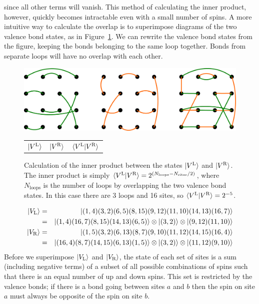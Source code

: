 since all other terms will vanish.  
This method of calculating the inner product, however, quickly becomes intractable even with a small number of spins.
A more intuitive way to calculate the overlap is to superimpose diagrams of the two valence bond states, as in Figure~\ref{overlap}.
We can rewrite the valence bond states from the figure, keeping the bonds belonging to the same 
loop together.  Bonds from separate loops will have no overlap with each other.
\begin{figure} {  
\centering
\includegraphics [width=5.5in]{./figures/made/overlap.pdf} 
\begin{tabular*}{5.5in}{ccc}
\hspace{12mm}$\lvert {V^\text{L}} \rangle$& 
\hspace{39mm}$\lvert {V^\text{R}} \rangle$ \hspace{40mm}& 
\hspace{33mm}$\langle {V^\text{L}} \rvert V^\text{R} \rangle$ \hspace{5mm}\\
\end{tabular*}
 \caption[Illustration of valence bond state inner product calculation]{
 Calculation of the inner product between the states $\lvert {V^\text{L}} \rangle$ and $\lvert {V^\text{R}} \rangle$.
 The inner product is simply 
 $\langle {V^\text{L}} \rvert V^\text{R} \rangle = 2^{(N_{\text{loops}}-N_{\text{sites}}/2)}$, 
 where $N_{\text{loops}}$ is the number of loops  by overlapping the 
 two valence bond states.
 In this case there are 3 loops and 16 sites, so 
 $\langle {V^\text{L}} \rvert V^\text{R} \rangle = 2^{-5}$.
 }
 \label{overlap}
 }
\end{figure}
\begin{eqnarray}
\lvert {V_\text{L}} \rangle &=&  \lvert {(1,4)(3,2)(6,5)(8,15)(9,12)(11,10)(14,13)(16,7)} \rangle\nonumber\\ 
			&=&  \lvert {(1,4)(16,7)(8,15)(14,13)(6,5)} \rangle\otimes\lvert {(3,2)} \rangle\otimes\lvert {(9,12)(11,10)} \rangle\\
\lvert {V_\text{R}} \rangle &=& \lvert {(1,5)(3,2)(6,13)(8,7)(9,10)(11,12)(14,15)(16,4)} \rangle\nonumber\\
			&=& \lvert {(16,4)(8,7)(14,15)(6,13)(1,5)} \rangle\otimes\lvert {(3,2)} \rangle\otimes\lvert {(11,12)(9,10)} \rangle
\end{eqnarray}
Before we superimpose $\lvert {V_\text{L}} \rangle$ and $\lvert {V_\text{R}} \rangle$, the state of each set of sites
is a sum (including negative terms) of a subset of all possible combinations of spins such that there is an equal number of up and down spins.  This set is restricted by the valence bonds; if there is a bond going between sites $a$ and $b$ then the spin on site $a$ must always be opposite of the spin on site $b$.  

